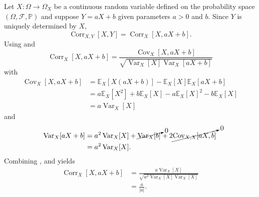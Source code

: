 \begin{example}
	Let $X:\Omega\to \Omega_X$ be a continuous random variable defined on the probability space $(\Omega,\mathcal{F},\mathbb{P})$ and suppose	$Y=aX+b$ given parameters $a>0$ and $b$. Since $Y$ is uniquely determined by $X$,
	\begin{equation}
		\operatorname{Corr}_{X,Y}[X,Y] = \operatorname{Corr}_{X}[X,aX+b].
	\end{equation}
	Using  and 
	\begin{equation}
		\operatorname{Corr}_{X}[X,aX+b] = \frac{\operatorname{Cov}_{X}[X,aX+b]}{\sqrt{\operatorname{Var}_X[X]\operatorname{Var}_X[aX+b]}}
		\label{eq:corra}
	\end{equation}
	with
	\begin{equation}
		\begin{split}
			\operatorname{Cov}_{X}[X,aX+b] & = \mathbb{E}_{X}[X(aX+b)]-\mathbb{E}_X[X]\mathbb{E}_X[aX+b]\\
			&= a\mathbb{E}_X[X^2]+b\mathbb{E}_X[X]-a\mathbb{E}_X[X]^2-b\mathbb{E}_X[X]\\
			&=a\operatorname{Var}_X[X]
		\end{split}
		\label{eq:corrb}
	\end{equation}
	and
	\begin{equation}
		\begin{split}
			\operatorname{Var}_X[aX+b] &= a^2\operatorname{Var}_X[X]+\cancelto{0}{\operatorname{Var}_X[b]}+2\cancelto{0}{\operatorname{Cov}_{X,X}[aX,b]}\\
			& = a^2\operatorname{Var}_X[X].
		\end{split}
		\label{eq:corrc}
	\end{equation}
	Combining ,  and  yields
	\begin{equation}
		\begin{split}
			\operatorname{Corr}_{X}[X,aX+b] &= \frac{a\operatorname{Var}_X[X]}{\sqrt{a^2\operatorname{Var}_X[X]\operatorname{Var}_X[X]}}\\
			&=\frac{a}{|a|}.
		\end{split}
	\end{equation}
\end{example}

